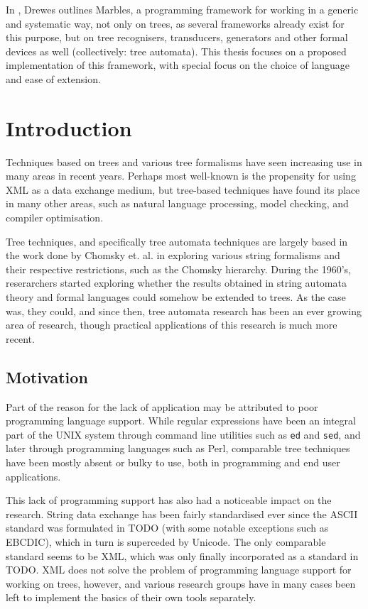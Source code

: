 In \cite{drewes_marbles}, Drewes outlines Marbles, a programming framework
for working in a generic and systematic way, not only on trees, as several
frameworks already exist for this purpose, but on tree recognisers,
transducers, generators and other formal devices as well (collectively:
tree automata). This thesis focuses on a proposed implementation of this
framework, with special focus on the choice of language and ease of
extension.




\section{Introduction}

Techniques based on trees and various tree formalisms have seen increasing
use in many areas in recent years. Perhaps most well-known is the
propensity for using XML as a data exchange medium, but tree-based
techniques have found its place in many other areas, such as natural
language processing, model checking, and compiler optimisation.

Tree techniques, and specifically tree automata techniques are largely
based in the work done by Chomsky et. al. in exploring various string
formalisms and their respective restrictions, such as the Chomsky
hierarchy. During the 1960's, reserarchers started exploring whether the
results obtained in string automata theory and formal languages could
somehow be extended to trees. As the case was, they could, and since then,
tree automata research has been an ever growing area of research, though
practical applications of this research is much more recent.

\subsection{Motivation}

Part of the reason for the lack of application may be attributed to poor
programming language support. While regular expressions have been an
integral part of the UNIX system through command line utilities such as
\texttt{ed} and \texttt{sed}, and later through programming languages such
as Perl, comparable tree techniques have been mostly absent or bulky to
use, both in programming and end user applications.

This lack of programming support has also had a noticeable impact on the
research. String data exchange has been fairly standardised ever since the
ASCII standard was formulated in TODO (with some notable exceptions such as
EBCDIC), which in turn is superceded by Unicode. The only comparable
standard seems to be XML, which was only finally incorporated as a standard
in TODO. XML does not solve the problem of programming language support for
working on trees, however, and various research groups have in many cases
been left to implement the basics of their own tools separately. 

